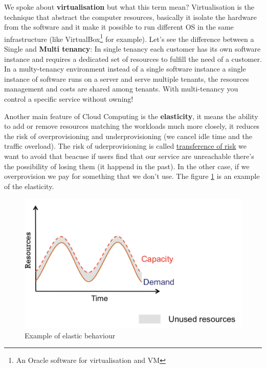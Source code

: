 We spoke about \textbf{virtualisation} but what this term mean?
Virtualisation is the technique that abstract the computer resources, basically it isolate the hardware from the software and it make it possible to run different OS in the same infrastructure (like VirtualBox\footnote{An Oracle software for virtualisation and VM} for example). Let's see the difference between a Single and \textbf{Multi tenancy}:
In single tenancy each customer has its own software instance and requires a dedicated set of resources to fulfill the need of a customer. In a multy-tenancy environment instead of a single software instance a single instance of software runs on a server and serve multiple tenants, the resources management and costs are shared among tenants. With multi-tenancy you control a specific service without owning!

Another main feature of Cloud Computing is the \textbf{elasticity}, it means the ability to add or remove resources matching the workloads much more closely, it reduces the risk of overprovisioning and underprovisioning (we cancel idle time and the traffic overload). The risk of uderprovisioning is called \underline{transference of risk} we want to avoid that beacuse if users find that our service are unreachable there's the possibility of losing them (it happend in the past). In the other case, if we overprovision we pay for something that we don't use. The figure \ref{fig:elastic} is an example of the elasticity.
\begin{figure}
    \centering
    \includegraphics[scale=0.25]{images/elasticity.png}
    \caption{Example of elastic behaviour}
    \label{fig:elastic}
\end{figure}
